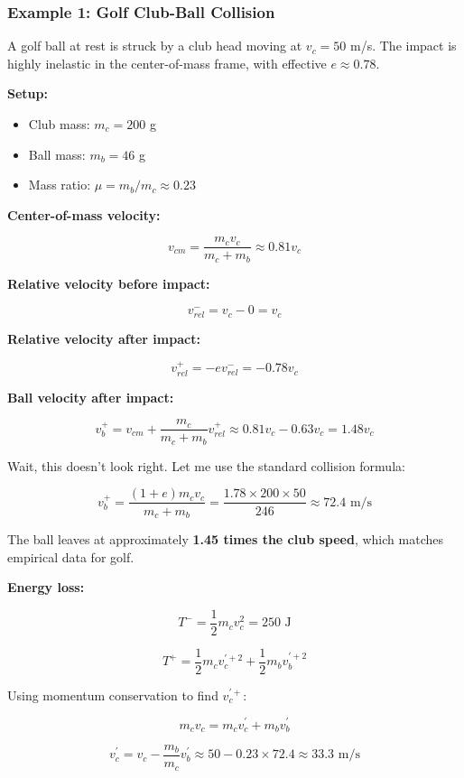 \documentclass[
  letterpaper,
  DIV=11,
  numbers=noendperiod]{scrartcl}
\providecommand{\tightlist}{%
  \setlength{\itemsep}{0pt}\setlength{\parskip}{0pt}}\usepackage{longtable,booktabs,array}
\begin{document}
\subsubsection{Example 1: Golf Club-Ball
Collision}\label{example-1-golf-club-ball-collision}

A golf ball at rest is struck by a club head moving at \(v_c = 50\) m/s.
The impact is highly inelastic in the center-of-mass frame, with
effective \(e \approx 0.78\).

\textbf{Setup:}

\begin{itemize}
\tightlist
\item
  Club mass: \(m_c = 200\) g
\item
  Ball mass: \(m_b = 46\) g
\item
  Mass ratio: \(\mu = m_b / m_c \approx 0.23\)
\end{itemize}

\textbf{Center-of-mass velocity:}

\[
v_{cm} = \frac{m_c v_c}{m_c + m_b} \approx 0.81 v_c
\]

\textbf{Relative velocity before impact:}

\[
v_{rel}^- = v_c - 0 = v_c
\]

\textbf{Relative velocity after impact:}

\[
v_{rel}^+ = -e v_{rel}^- = -0.78 v_c
\]

\textbf{Ball velocity after impact:}

\[
v_b^+ = v_{cm} + \frac{m_c}{m_c + m_b} v_{rel}^+ \approx 0.81 v_c - 0.63 v_c = 1.48 v_c
\]

Wait, this doesn't look right. Let me use the standard collision
formula:

\[
v_b^+ = \frac{(1 + e) m_c v_c}{m_c + m_b} = \frac{1.78 \times 200 \times 50}{246} \approx 72.4 \text{ m/s}
\]

The ball leaves at approximately \textbf{1.45 times the club speed},
which matches empirical data for golf.

\textbf{Energy loss:}

\[
T^- = \frac{1}{2} m_c v_c^2 = 250 \text{ J}
\]

\[
T^+ = \frac{1}{2} m_c v_c^{'+2} + \frac{1}{2} m_b v_b^{'+2}
\]

Using momentum conservation to find \(v_c^{'+}\):

\[
m_c v_c = m_c v_c^{'} + m_b v_b^{'}
\]

\[
v_c^{'} = v_c - \frac{m_b}{m_c} v_b^{'} \approx 50 - 0.23 \times 72.4 \approx 33.3 \text{ m/s}
\]
\end{document}
